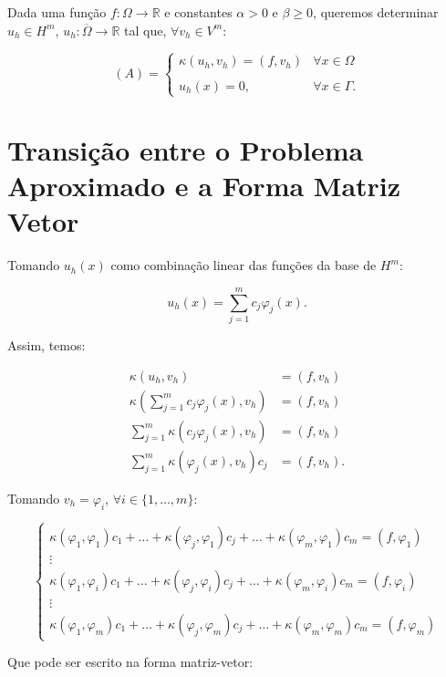 Dada uma função $f: \Omega \to \mathbb{R}$ e constantes $\alpha > 0$ e $\beta \geq 0$, queremos determinar $u_h \in H^m$, $u_h : \overline{\Omega} \to \mathbb{R}$ tal que, $\forall v_h \in V^m$:

\[(A) = \begin{cases}
  \kappa(u_h,v_h) = (f,v_h) &\forall x \in \Omega \\\\
  u_h(x) = 0 ,\quad &\forall x \in \Gamma.
\end{cases}\]


\section{Transição entre o Problema Aproximado e a Forma Matriz Vetor}

  Tomando $u_h(x)$ como combinação linear das funções da base de $H^m$:

  \[u_h(x) = \sum_{j=1}^{m}c_j\varphi_j(x).\]

  Assim, temos:

  \begin{align*}
    \kappa(u_h,v_h) &= (f,v_h) \\
    \kappa(\sum_{j=1}^{m}c_j\varphi_j(x),v_h) &= (f,v_h) \\
    \sum_{j=1}^{m} \kappa(c_j\varphi_j(x),v_h) &= (f,v_h) \\
    \sum_{j=1}^{m} \kappa(\varphi_j(x),v_h)c_j &= (f,v_h).
  \end{align*}

  Tomando $v_h = \varphi_i$, $\forall i \in \{1,\dots,m\}$:

  \[\begin{cases}
    \kappa(\varphi_1, \varphi_1)c_1 + \dots + \kappa(\varphi_j, \varphi_1)c_j + \dots + \kappa(\varphi_m, \varphi_1)c_m = (f, \varphi_1)\\
    \vdots \\
    \kappa(\varphi_1, \varphi_i)c_1 + \dots + \kappa(\varphi_j, \varphi_i)c_j + \dots + \kappa(\varphi_m, \varphi_i)c_m = (f, \varphi_i)\\
    \vdots \\
    \kappa(\varphi_1, \varphi_m)c_1 + \dots + \kappa(\varphi_j, \varphi_m)c_j + \dots + \kappa(\varphi_m, \varphi_m)c_m = (f, \varphi_m)
  \end{cases}\]

  Que pode ser escrito na forma matriz-vetor:

